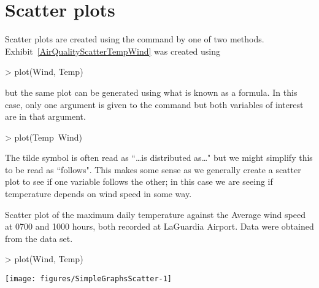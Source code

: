 
\section{Scatter plots} 
 
Scatter plots are created using the  command by one of two methods. Exhibit~\ref{AirQualityScatterTempWind} was created using 

\begin{Schunk}
\begin{Sinput}
> plot(Wind, Temp) 
\end{Sinput}
\end{Schunk}

but the same plot can be generated using what is known as a formula. In this case, only one argument is given to the  command but both variables of interest are in that argument. 

\begin{Schunk}
\begin{Sinput}
> plot(Temp~Wind) 
\end{Sinput}
\end{Schunk}

The tilde symbol is often read as ``\ldots is distributed as\ldots" but we might simplify this to be read as ``follows". This makes some sense as we generally create a scatter plot to see if one variable follows the other; in this case we are seeing if temperature depends on wind speed in some way. 
 
\begin{exhibit} 
\begin{center} 
\caption{Scatter plot of the maximum daily temperature against the Average wind speed at 0700 and 1000 hours, both recorded at LaGuardia Airport. Data were obtained from the  data set.} 
\label{AirQualityScatterTempWind} 

\begin{Schunk}
\begin{Sinput}
> plot(Wind, Temp) 
\end{Sinput}

\texttt{[image: figures/SimpleGraphsScatter-1]} \end{Schunk}

\end{center} 
\end{exhibit} 
 
